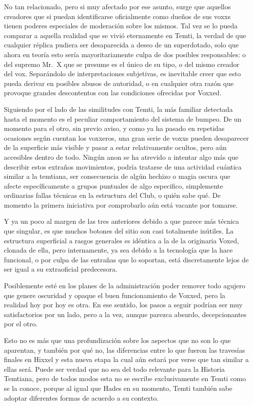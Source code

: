 \documentclass[
  spanish,
]{book}
\begin{document}
No tan relacionado, pero si muy afectado por ese asunto, surge que aquellos creadores que si puedan identificarse oficialmente como dueños de sus voxxs tienen poderes especiales de moderación sobre los mismos. Tal vez se lo pueda comparar a aquella realidad que se vivió eternamente en Temti, la verdad de que cualquier réplica pudiera ser desaparecida a deseo de un superdotado, solo que ahora en teoría esto sería mayoritariamente culpa de dos posibles responsables: o del supremo Mr.~X que se presume es el único de su tipo, o del mismo creador del vox. Separándolo de interpretaciones subjetivas, es inevitable creer que esto pueda derivar en posibles abusos de autoridad, o en cualquier otra razón que provoque grandes descontentos con las condiciones ofrecidas por Voxxed.

Siguiendo por el lado de las similitudes con Temti, la más familiar detectada hasta el momento es el peculiar comportamiento del sistema de bumpeo. De un momento para el otro, sin previo aviso, y como ya ha pasado en repetidas ocasiones según cuentan los voxxeros, una gran serie de voxxs pueden desaparecer de la superficie más visible y pasar a estar relativamente ocultos, pero aún accesibles dentro de todo. Ningún anon se ha atrevido a intentar algo más que describir estos extraños movimientos, podría tratarse de una actividad cuántica similar a la temtiana, ser consecuencia de algún hechizo o magia oscura que afecte específicamente a grupos puntuales de algo especifico, simplemente ordinarias fallas técnicas en la estructura del Club, o quién sabe qué. De momento la primera iniciativa por comprobarlo aún está vacante por tomarse.

Y ya un poco al margen de las tres anteriores debido a que parece más técnica que singular, es que muchos botones del sitio son casi totalmente inútiles. La estructura superficial a rasgos generales es idéntica a la de la originaria Voxed, clonada de ella, pero internamente, ya sea debido a la tecnología que la hace funcional, o por culpa de las entrañas que lo soportan, está discretamente lejos de ser igual a su extraoficial predecesora.

Posiblemente esté en los planes de la administración poder remover todo agujero que genere oscuridad y opaque el buen funcionamiento de Voxxed, pero la realidad hoy por hoy es otra. En ese sentido, los pasos a seguir podrían ser muy satisfactorios por un lado, pero a la vez, aunque parezca absurdo, decepcionantes por el otro.

Esto no es más que una profundización sobre los aspectos que no son lo que aparentan, y también por qué no, las diferencias entre lo que fueron las travesías finales en Hixxel y esta nueva etapa la cual aún estará por verse que tan similar a ellas será. Puede ser verdad que no sea del todo relevante para la Historia Temtiana, pero de todos modos esta no se escribe exclusivamente en Temti como se la conoce, porque al igual que Hades en su momento, Temti también sabe adoptar diferentes formas de acuerdo a su contexto.
\end{document}
